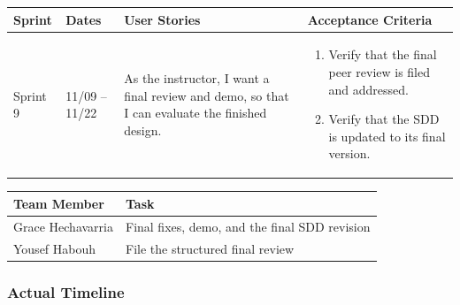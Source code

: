 \documentclass[12pt]{article}
\begin{document}
\noindent\begin{minipage}{\linewidth}

\vspace{0.5em}
\noindent
\begin{tabular}{|L{1.2cm}|L{1.8cm}|L{5.2cm}|L{6.3cm}|}
\hline
\textbf{Sprint} & \textbf{Dates} & \textbf{User Stories} & \textbf{Acceptance Criteria} \\
\hline
Sprint 9 & 11/09 -- 11/22 &
As the instructor, I want a final review and demo, so that I can evaluate the finished design. &
\begin{enumerate}
    \item Verify that the final peer review is filed and addressed.
    \item Verify that the SDD is updated to its final version.
\end{enumerate} \\
\hline
\end{tabular}

\vspace{0.5em}
\noindent
\begin{tabular}{|L{3.4cm}|L{11.6cm}|}
\hline
\textbf{Team Member} & \textbf{Task} \\
\hline
Grace Hechavarria & Final fixes, demo, and the final SDD revision \\
\hline
Yousef Habouh & File the structured final review \\
\hline
\end{tabular}
\end{minipage}

\subsubsection{Actual Timeline}
\end{document}
